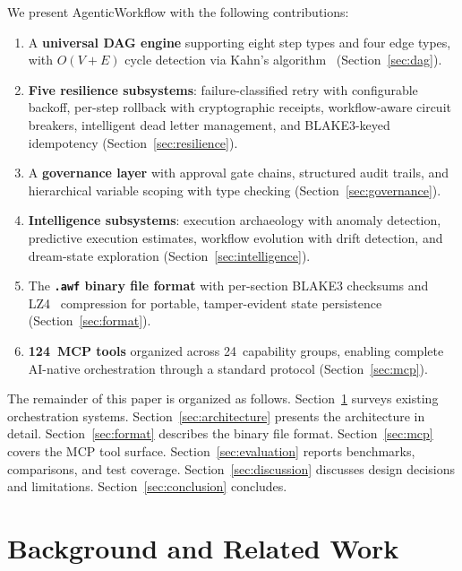\documentclass[10pt, twocolumn]{article}
\begin{document}
We present AgenticWorkflow with the following contributions:
\begin{enumerate}[nosep, leftmargin=*]
  \item A \textbf{universal DAG engine} supporting eight step types and four edge types, with $O(V + E)$ cycle detection via Kahn's algorithm~\cite{kahn1962} (Section~\ref{sec:dag}).
  \item \textbf{Five resilience subsystems}: failure-classified retry with configurable backoff, per-step rollback with cryptographic receipts, workflow-aware circuit breakers, intelligent dead letter management, and BLAKE3-keyed idempotency (Section~\ref{sec:resilience}).
  \item A \textbf{governance layer} with approval gate chains, structured audit trails, and hierarchical variable scoping with type checking (Section~\ref{sec:governance}).
  \item \textbf{Intelligence subsystems}: execution archaeology with anomaly detection, predictive execution estimates, workflow evolution with drift detection, and dream-state exploration (Section~\ref{sec:intelligence}).
  \item The \textbf{\texttt{.awf} binary file format} with per-section BLAKE3 checksums and LZ4~\cite{collet2013lz4} compression for portable, tamper-evident state persistence (Section~\ref{sec:format}).
  \item \textbf{124~MCP tools} organized across 24~capability groups, enabling complete AI-native orchestration through a standard protocol (Section~\ref{sec:mcp}).
\end{enumerate}

The remainder of this paper is organized as follows. Section~\ref{sec:related} surveys existing orchestration systems. Section~\ref{sec:architecture} presents the architecture in detail. Section~\ref{sec:format} describes the binary file format. Section~\ref{sec:mcp} covers the MCP tool surface. Section~\ref{sec:evaluation} reports benchmarks, comparisons, and test coverage. Section~\ref{sec:discussion} discusses design decisions and limitations. Section~\ref{sec:conclusion} concludes.


\section{Background and Related Work}\label{sec:related}
\end{document}
